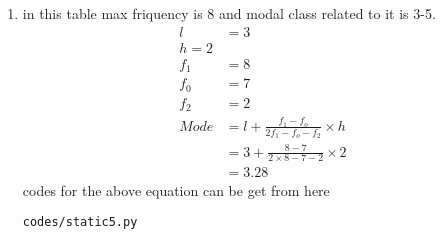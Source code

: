\renewcommand{\theequation}{\theenumi}
\begin{enumerate}[label=\arabic*.,ref=\thesubsection.\theenumi]
\item in this table max friquency is 8 and modal class related to it is 3-5.
\\
\begin{align}
l &= 3
\\
h = 2
\\
f_1 &= 8
\\
f_0 &= 7
\\
f_2 &= 2
\\
Mode &= l+\frac{f_1 - f_o}{2f_1 - f_o - f_2}\times h
\\
&= 3+\frac{8 - 7}{2\times 8 - 7- 2}\times 2
\\
&=3.28
\end{align}
codes for the above equation can be get from here
\begin{lstlisting}
codes/static5.py
\end{lstlisting}
\end{enumerate}